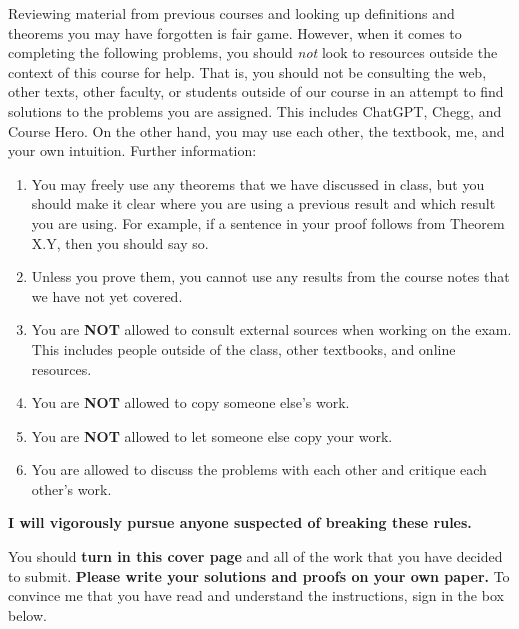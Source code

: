 \documentclass[11pt]{article}
\theoremstyle{definition}
\begin{document}
Reviewing material from previous courses and looking up definitions and theorems you may have forgotten is fair game. However, when it comes to completing the following problems, you should \emph{not} look to resources outside the context of this course for help.  That is, you should not be consulting the web, other texts, other faculty, or students outside of our course in an attempt to find solutions to the problems you are assigned.  This includes ChatGPT, Chegg, and Course Hero. On the other hand, you may use each other, the textbook, me, and your own intuition. Further information:
\begin{enumerate}
\item You may freely use any theorems that we have discussed in class, but you should make it clear where you are using a previous result and which result you are using.  For example, if a sentence in your proof follows from Theorem X.Y, then you should say so.
\item Unless you prove them, you cannot use any results from the course notes that we have not yet covered.
\item You are \textbf{NOT} allowed to consult external sources when working on the exam.  This includes people outside of the class, other textbooks, and online resources.
\item You are \textbf{NOT} allowed to copy someone else's work.
\item You are \textbf{NOT} allowed to let someone else copy your work.
\item You are allowed to discuss the problems with each other and critique each other's work.
\end{enumerate}

\begin{center}
\textbf{I will vigorously pursue anyone suspected of breaking these rules.}
\end{center}

You should \textbf{turn in this cover page} and all of the work that you have decided to submit. \textbf{Please write your solutions and proofs on your own paper.} To convince me that you have read and understand the instructions, sign in the box below.

\bigskip


\bigskip
\end{document}
